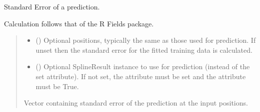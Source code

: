 \documentclass[letterpaper,10pt,english]{sphinxmanual}
\begin{document}
\begin{fulllineitems}
\begin{fulllineitems}
\begin{quote}
\begin{description}
\begin{itemize}
\end{itemize}


\end{description}\end{quote}

\end{fulllineitems}


\begin{fulllineitems}
\label{\detokenize{splines:glomar_gridding.spline.SphericalThinPlateSpline.standard_error}}
\pysigstartsignatures
\pysiglinewithargsret
{}
{\sphinxparamcomma {}}
{}
\pysigstopsignatures
\sphinxAtStartPar
Standard Error of a prediction.

\sphinxAtStartPar
Calculation follows that of the R Fields package. 
\begin{quote}\begin{description}
\begin{itemize}
\item {}
\sphinxAtStartPar
{} () \textendash{} Optional positions, typically the same as those used for prediction.
If unset then the standard error for the fitted training data is
calculated.

\item {}
\sphinxAtStartPar
{} () \textendash{} Optional SplineResult instance to use for prediction (instead of the
set  attribute). If not set, the  attribute must be
set and the  attribute must be True.

\end{itemize}

\sphinxAtStartPar
Vector containing standard error of the prediction at the input
positions.

\sphinxAtStartPar
{}

\end{description}\end{quote}

\end{fulllineitems}


\end{fulllineitems}
\end{document}
